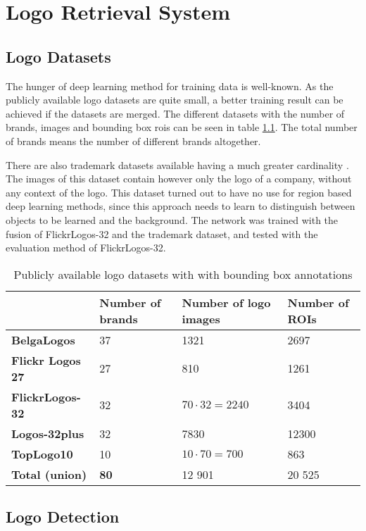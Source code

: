 \chapter{Logo Retrieval System}

\section{Logo Datasets}
The hunger of deep learning method for training data is well-known. As the publicly available logo datasets are quite small, a better training result can be achieved if the datasets are merged. The different datasets with the number of brands, images and bounding box rois can be seen in table \ref{table:logodatasets}. The total number of brands means the number of different brands altogether.

There are also trademark datasets available having a much greater cardinality \cite{DBLP:journals/corr/TursunAK17}. The images of this dataset contain however only the logo of a company, without any context of the logo. This dataset turned out to have no use for region based deep learning methods, since this approach needs to learn to distinguish between objects to be learned and the background. The network was trained with the fusion of FlickrLogos-32 and the trademark dataset, and tested with the evaluation method of FlickrLogos-32.
\begin{table}[ht!]
\centering
\caption{Publicly available logo datasets with with bounding box annotations}
\label{table:logodatasets}
\begin{tabular}{|l|l|l|l|}
\hline & \textbf{Number of brands} & \textbf{Number of logo images} & \textbf{Number of ROIs} \\
\hline
\textbf{BelgaLogos} & 37 & 1321 & 2697 \\
\hline
\textbf{Flickr Logos 27} & 27 & 810 & 1261 \\
\hline
\textbf{FlickrLogos-32} & 32 & $70 \cdot 32 = 2240$ & 3404 \\
\hline
\textbf{Logos-32plus} & 32 & 7830 & 12300 \\
\hline
\textbf{TopLogo10} & 10 & $10 \cdot 70 = 700$ & 863 \\
\hline\hline
\textbf{Total (union)} & \textbf{80} & 12 901 & 20 525 \\ \hline
\end{tabular}
\end{table}

\section{Logo Detection}


